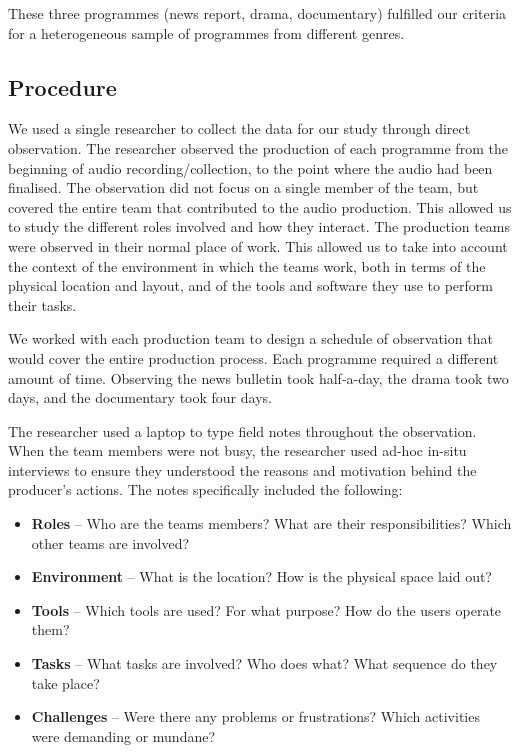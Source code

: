 These three programmes (news report, drama, documentary) fulfilled our criteria for a heterogeneous sample of
programmes from different genres.

\subsection{Procedure}
We used a single researcher to collect the data for our study through direct observation. The researcher observed the
production of each programme from the beginning of audio recording/collection, to the point where the audio had been
finalised. The observation did not focus on a single member of the team, but covered the entire team that
contributed to the audio production. This allowed us to study the different roles involved  and how they interact.  The
production teams were observed in their normal place of work. This allowed us to take into account the context of the
environment in which the teams work, both in terms of the physical location and layout, and of the tools and software
they use to perform their tasks.

We worked with each production team to design a schedule of observation that would cover the entire production process.
Each programme required a different amount of time. Observing the news bulletin took half-a-day, the drama took two
days, and the documentary took four days. 

The researcher used a laptop to type field notes throughout the observation. When the team members were not busy, the
researcher used ad-hoc in-situ interviews to ensure they understood the reasons and motivation behind the producer's
actions. The notes specifically included the following:

{\singlespacing
\begin{itemize}
	\item \textbf{Roles} -- Who are the teams members? What are their responsibilities? Which other teams are involved?
	\item \textbf{Environment} -- What is the location? How is the physical space laid out?
	\item \textbf{Tools} -- Which tools are used? For what purpose? How do the users operate them?
	\item \textbf{Tasks} -- What tasks are involved? Who does what? What sequence do they take place?
	\item \textbf{Challenges} -- Were there any problems or frustrations? Which activities were demanding or mundane?
\end{itemize}
}

